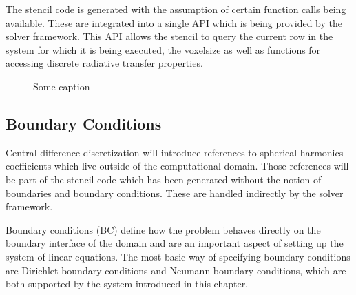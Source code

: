 The stencil code is generated with the assumption of certain function calls being available. These are integrated into a single API which is being provided by the solver framework. This API allows the stencil to query the current row in the system for which it is being executed, the voxelsize as well as functions for accessing discrete radiative transfer properties.
\begin{figure}[h]
\centering
{}
\caption{Some caption}
\label{fig:pn_discretization_codegen_stencilAPI}
\end{figure}


\subsection{Boundary Conditions}
\label{sec:pn_bc}

Central difference discretization will introduce references to spherical harmonics coefficients which live outside of the computational domain. Those references will be part of the stencil code which has been generated without the notion of boundaries and boundary conditions. These are handled indirectly by the solver framework.

Boundary conditions (BC) define how the problem behaves directly on the boundary interface of the domain and are an important aspect of setting up the system of linear equations. The most basic way of specifying boundary conditions are Dirichlet boundary conditions and Neumann boundary conditions, which are both supported by the system introduced in this chapter.

